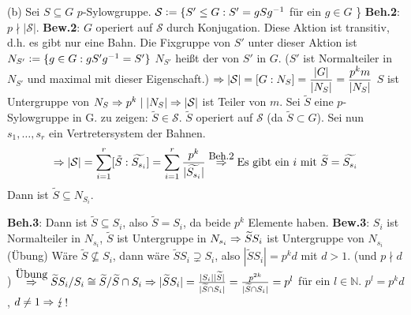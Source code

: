 \documentclass[a4paper,10pt,german]{scrbook}
\newcommand{\blitzb}[0]{\lightning}
\theoremstyle{saetze}
\theoremstyle{definitionen}
\begin{document}
{        \item[(b)] Sei $S \subseteq G$ $p$-Sylowgruppe. \newline
        $\mathcal{S} \mathrel{\mathop:}= \{S' \le G:S' = gSg^{-1}$ für ein $g \in G$ \}
        \newline
        \textbf{Beh.2}:
            $p \nmid |\mathcal{S}|$.
        \newline
        \textbf{Bew.2}:
            $G$ operiert auf $\mathcal{S}$ durch Konjugation. Diese Aktion ist
            transitiv, d.h. es gibt nur eine Bahn. Die Fixgruppe von $S'$ unter
            dieser Aktion ist $N_{S'} \mathrel{\mathop:}= \{g\in G: gS'g^{-1} = S'\}$
            \newline
            $N_{S'}$ heißt der  von $S'$ in $G$.\newline
            ($S'$ ist Normalteiler in $N_{S'}$ und maximal mit dieser
            Eigenschaft.) \newline
            $\displaystyle\Rightarrow |\mathcal{S}| = [G:N_{S}] = \frac{|G|}{|N_{S}|} =
            \frac{p^k m}{|N_{S}|}\\$ $S$ ist Untergruppe von $N_{S} \Rightarrow p^k
            \mid |N_{S}| \Rightarrow |\mathcal{S}|$ ist Teiler von $m$. \newline
            Sei $\widetilde{S}$ eine $p$-Sylowgruppe in G. zu zeigen:
         $\widetilde{S} \in \mathcal{S}$. \newline 
         $\widetilde{S}$ operiert auf 
         $\mathcal{S}$ (da $\tilde S \subset G$). Sei nun $s_1, \dots, s_r$ ein
         Vertretersystem der Bahnen. \[\displaystyle \Rightarrow |\mathcal{S}| = \sum_{i=1}^r
         [\tilde S : \widetilde{S_{s_i}}] = \sum_{i=1}^r
         \frac{p^k}{|\widetilde{S_{s_i}}|} \overset{\mbox{\small Beh.2}}{\Rightarrow}
         \mbox{Es gibt ein } i \mbox{ mit } \widetilde S = \widetilde{S_{s_i}}\]
         Dann ist $\widetilde{S} \subseteq N_{S_i}$.
        
	\textbf{Beh.3}:
            Dann ist $\widetilde{S} \subseteq S_i$, also $\widetilde{S} = S_i$,
            da beide $p^k$ Elemente haben. \newline
        \textbf{Bew.3}:
            $S_i$ ist Normalteiler in $N_{s_i}$, $\tilde S$ ist Untergruppe in
            $N_{s_i} \Rightarrow \widetilde{S} S_i$ ist Untergruppe von $N_{s_i}$ (Übung) \newline
            Wäre $\widetilde{S} \not \subseteq S_i$, dann wäre $\widetilde{S}
            S_i \supsetneq S_i$, also $|\widetilde{S} S_i| = p^k d$ mit $d>1$.
            (und $p \nmid d$) \newline
            $\overset{\mbox{Übung}}{\Rightarrow} \widetilde{S} S_i / S_i \cong 
            \widetilde{S} / \widetilde{S} \cap S_i \Rightarrow |\widetilde{S} S_i| = 
            \frac{|S_i| |\widetilde{S}|}{|\widetilde{S} \cap S_i|} = 
            \frac{p^{2k}}{|\widetilde S \cap S_i|} = p^l$ für ein $l\in\mathbb N$. $p^l=p^k d$,
            $d \neq 1 \Ra \blitzb$!
    
}
\end{document}
